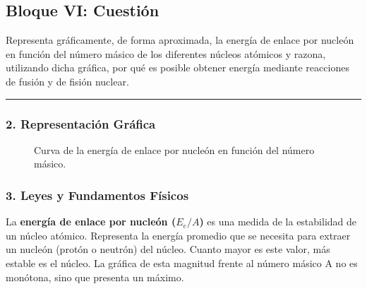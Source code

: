 \newpage

\subsection{Bloque VI: Cuestión}
\label{subsec:B6_2012_jun_ord}
\begin{cajaenunciado}
Representa gráficamente, de forma aproximada, la energía de enlace por nucleón en función del número másico de los diferentes núcleos atómicos y razona, utilizando dicha gráfica, por qué es posible obtener energía mediante reacciones de fusión y de fisión nuclear.
\end{cajaenunciado}
\hrule

\subsubsection*{2. Representación Gráfica}
\begin{figure}[H]
    \centering
    \caption{Curva de la energía de enlace por nucleón en función del número másico.}
\end{figure}

\subsubsection*{3. Leyes y Fundamentos Físicos}
La \textbf{energía de enlace por nucleón ($E_e/A$)} es una medida de la estabilidad de un núcleo atómico. Representa la energía promedio que se necesita para extraer un nucleón (protón o neutrón) del núcleo. Cuanto mayor es este valor, más estable es el núcleo. La gráfica de esta magnitud frente al número másico A no es monótona, sino que presenta un máximo.

